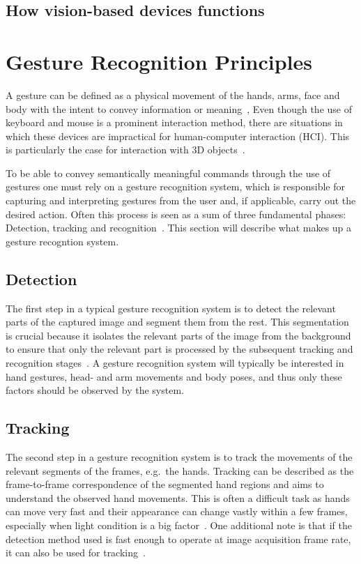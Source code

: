 \subsection{How vision-based devices functions}


\section{Gesture Recognition Principles}
A gesture can be defined as a physical movement of the hands, arms, face and body with the intent to convey information or meaning~\citep{Mitra2007}, 
Even though the use of keyboard and mouse is a prominent interaction method, there are situations in which
these devices are impractical for human-computer interaction (HCI). This is particularly the case for interaction with 3D objects~\citep{Rautaray2015}. 

To be able to convey semantically meaningful commands through the use of gestures one must rely on a gesture recognition system, 
which is responsible for capturing and interpreting gestures from the user and, if applicable, carry out the desired action. 
Often this process is seen as a sum of three fundamental phases: Detection, tracking and recognition~\citep{Rautaray2015}.
This section will describe what makes up a gesture recogntion system.

\subsection{Detection}
The first step in a typical gesture recognition system is to detect the relevant parts of the captured image and segment them from the rest. 
This segmentation is crucial because it isolates the relevant parts of the image from the background to ensure that only the relevant part is processed by the subsequent 
tracking and recognition stages~\citep{Cote2006}. 
A gesture recognition system will typically be interested in hand gestures, head- and arm movements and body poses, and thus only these factors should be observed by the system.

\subsection{Tracking}
The second step in a gesture recognition system is to track the movements of the relevant segments of the frames, e.g.~the hands. 
Tracking can be described as the frame-to-frame correspondence of the segmented hand regions and aims to understand the observed hand movements. 
This is often a difficult task as hands can move very fast and their appearance can change vastly within a few frames, 
especially when light condition is a big factor~\citep{Wang2010}. 
One additional note is that if the detection method used is fast enough to operate at image acquisition frame rate, it can also be used for tracking~\citep{Rautaray2015}.   

